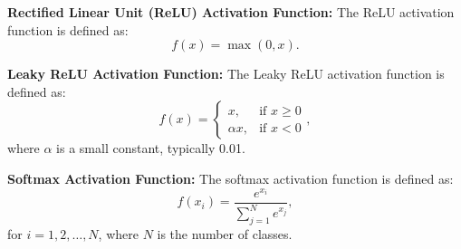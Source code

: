\begin{example}
    \textbf{Rectified Linear Unit (ReLU) Activation Function:}
    The ReLU activation function is defined as:
    $$
    f(x) = \max(0, x).
    $$
\end{example}
    
\begin{example}
    \textbf{Leaky ReLU Activation Function:}
    The Leaky ReLU activation function is defined as:
    $$
    f(x) = \begin{cases} x, & \text{if } x \geq 0 \\ \alpha x, & \text{if } x < 0 \end{cases},
    $$
    where $\alpha$ is a small constant, typically 0.01.
\end{example}
    
\begin{example}
    \textbf{Softmax Activation Function:}
    The softmax activation function is defined as:
    $$
    f(x_i) = \frac{e^{x_i}}{\sum_{j=1}^{N} e^{x_j}},
    $$
    for $i = 1, 2, \ldots, N$, where $N$ is the number of classes.
\end{example}

